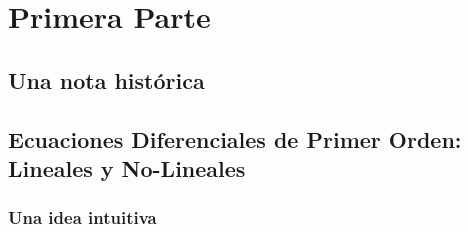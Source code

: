 \documentclass[11pt,fleqn]{book} %
\begin{document}




\pagestyle{empty} %

\tableofcontents %

\cleardoublepage %

\pagestyle{fancy} %


\part{Primera Parte}



\chapter{Una nota histórica}


\chapter{Ecuaciones Diferenciales de Primer Orden:
        Lineales y No-Lineales}

\section{Una idea intuitiva}
\end{document}
